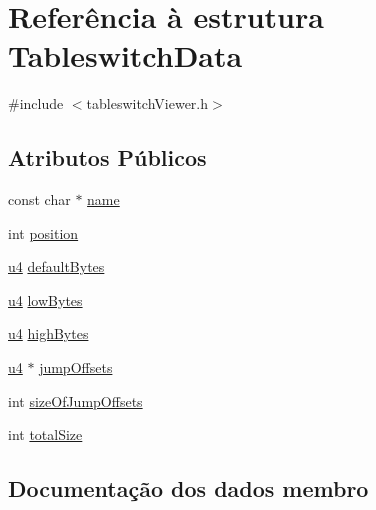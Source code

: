 \hypertarget{struct_tableswitch_data}{}\section{Referência à estrutura Tableswitch\+Data}
\label{struct_tableswitch_data}


{\ttfamily \#include $<$tableswitch\+Viewer.\+h$>$}

\subsection*{Atributos Públicos}
\begin{DoxyCompactItemize}
\item 
const char $\ast$ \hyperlink{struct_tableswitch_data_ab6d07b5a3cfc2a5b057b2cac64b091bc}{name}
\item 
int \hyperlink{struct_tableswitch_data_ada868ee85ea6b04b2bf1030243321b50}{position}
\item 
\hyperlink{util_8h_ae391a1d79bb0c8cbc283f0283e3c098b}{u4} \hyperlink{struct_tableswitch_data_a2b46f1937bf9babdcb9c47bcf061670f}{default\+Bytes}
\item 
\hyperlink{util_8h_ae391a1d79bb0c8cbc283f0283e3c098b}{u4} \hyperlink{struct_tableswitch_data_a10983be20e311853047e753ff117ffa9}{low\+Bytes}
\item 
\hyperlink{util_8h_ae391a1d79bb0c8cbc283f0283e3c098b}{u4} \hyperlink{struct_tableswitch_data_ad8d3fe5b70cc6b71671df9e254a60ee0}{high\+Bytes}
\item 
\hyperlink{util_8h_ae391a1d79bb0c8cbc283f0283e3c098b}{u4} $\ast$ \hyperlink{struct_tableswitch_data_aee5b0bcaea9d232e3ab73784655ac003}{jump\+Offsets}
\item 
int \hyperlink{struct_tableswitch_data_a1b6e4dc45c22bbeb94350bad630659ea}{size\+Of\+Jump\+Offsets}
\item 
int \hyperlink{struct_tableswitch_data_a3307b28129c7614fa88231d7f3c47b30}{total\+Size}
\end{DoxyCompactItemize}


\subsection{Documentação dos dados membro}
\mbox{\label{struct_tableswitch_data_a2b46f1937bf9babdcb9c47bcf061670f}} 
